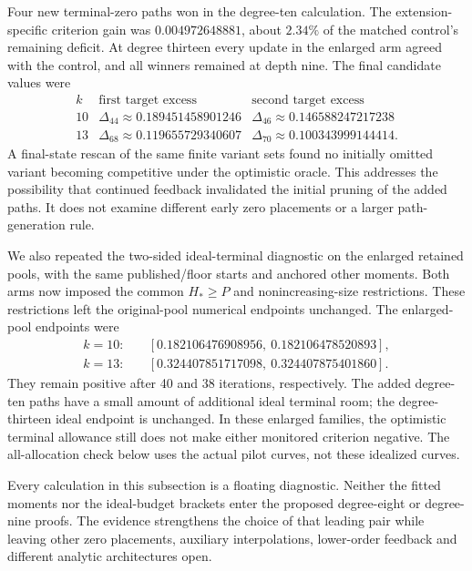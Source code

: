 \documentclass[11pt,letterpaper]{article}
\numberwithin{equation}{section}
\begin{document}
Four new terminal-zero paths won in the degree-ten calculation. The
extension-specific criterion gain was $0.004972648881$, about $2.34\%$ of
the matched control's remaining deficit. At degree thirteen every update
in the enlarged arm agreed with the control, and all winners remained at
depth nine. The final candidate values were
\[
\begin{array}{c|cc}
k&\text{first target excess}&\text{second target excess}\\\hline
10&\Delta_{44}\approx0.189451458901246&
   \Delta_{46}\approx0.146588247217238\\
13&\Delta_{68}\approx0.119655729340607&
   \Delta_{70}\approx0.100343999144414.
\end{array}
\]
A final-state rescan of the same finite variant sets found no initially
omitted variant becoming competitive under the optimistic oracle. This
addresses the possibility that continued feedback invalidated the initial
pruning of the added paths. It does not examine different early zero
placements or a larger path-generation rule.

We also repeated the two-sided ideal-terminal diagnostic on the enlarged
retained pools, with the same published/floor starts and anchored other
moments. Both arms now imposed the common $H_*\ge P$ and nonincreasing-size
restrictions. These restrictions left the original-pool numerical endpoints
unchanged. The enlarged-pool endpoints were
\begin{align*}
k=10:&\quad [0.182106476908956,\ 0.182106478520893],\\
k=13:&\quad [0.324407851717098,\ 0.324407875401860].
\end{align*}
They remain positive after 40 and 38 iterations, respectively. The added
degree-ten paths have a small amount of additional ideal terminal room;
the degree-thirteen ideal endpoint is unchanged. In these enlarged families,
the optimistic terminal allowance still does not make either monitored
criterion negative. The all-allocation check below uses the actual pilot
curves, not these idealized curves.

Every calculation in this subsection is a floating diagnostic. Neither the
fitted moments nor the ideal-budget brackets enter the proposed degree-eight
or degree-nine proofs. The evidence strengthens the choice of that leading
pair while leaving other zero placements, auxiliary interpolations,
lower-order feedback and different analytic architectures open.
\end{document}
